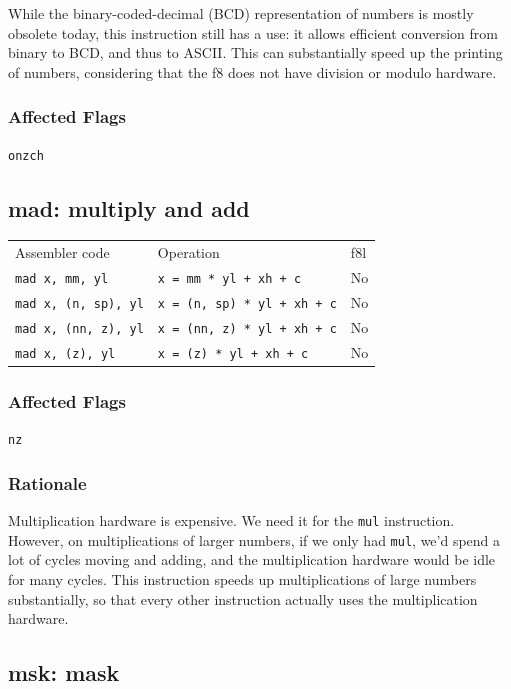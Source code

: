 \documentclass{book}
\begin{document}
While the binary-coded-decimal (BCD) representation of numbers is mostly obsolete today, this instruction still has a use: it allows efficient conversion from binary to BCD, and thus to ASCII. This can substantially speed up the printing of numbers, considering that the f8 does not have division or modulo hardware.


\subsubsection*{Affected Flags}

\texttt{onzch}


\subsection{mad: multiply and add}

\begin{tabular}{l l l}
Assembler code              & Operation                          & f8l \\
\texttt{mad x, mm, yl}      & \texttt{x = mm * yl + xh + c}      & No \\
\texttt{mad x, (n, sp), yl} & \texttt{x = (n, sp) * yl + xh + c} & No \\
\texttt{mad x, (nn, z), yl} & \texttt{x = (nn, z) * yl + xh + c} & No \\
\texttt{mad x, (z), yl}     & \texttt{x = (z) * yl + xh + c}     & No \\
\end{tabular}

\subsubsection*{Affected Flags}

\texttt{nz}

\subsubsection*{Rationale}

Multiplication hardware is expensive. We need it for the \texttt{mul} instruction. However, on multiplications of larger numbers, if we only had \texttt{mul}, we'd spend a lot of cycles moving and adding, and the multiplication hardware would be idle for many cycles. This instruction speeds up multiplications of large numbers substantially, so that every other instruction actually uses the multiplication hardware.


\subsection{msk: mask}
\end{document}
